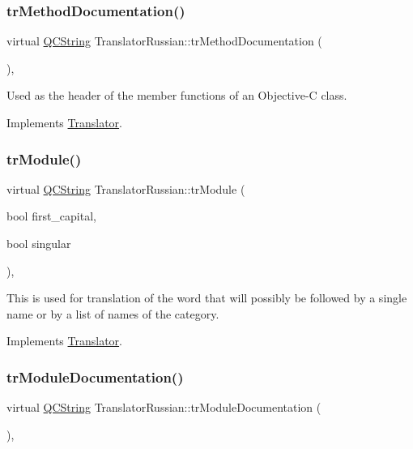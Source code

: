 \subsubsection{\texorpdfstring{trMethodDocumentation()}{trMethodDocumentation()}}
{\footnotesize\ttfamily virtual \mbox{\hyperlink{class_q_c_string}{Q\+C\+String}} Translator\+Russian\+::tr\+Method\+Documentation (\begin{DoxyParamCaption}{ }\end{DoxyParamCaption})\hspace{0.3cm}{\ttfamily [inline]}, {\ttfamily [virtual]}}

Used as the header of the member functions of an Objective-\/C class. 

Implements \mbox{\hyperlink{class_translator}{Translator}}.

\mbox{\label{class_translator_russian_ac995e3a2adc188b6cb5881d9b891533a}} 
\subsubsection{\texorpdfstring{trModule()}{trModule()}}
{\footnotesize\ttfamily virtual \mbox{\hyperlink{class_q_c_string}{Q\+C\+String}} Translator\+Russian\+::tr\+Module (\begin{DoxyParamCaption}\item[{bool}]{first\+\_\+capital,  }\item[{bool}]{singular }\end{DoxyParamCaption})\hspace{0.3cm}{\ttfamily [inline]}, {\ttfamily [virtual]}}

This is used for translation of the word that will possibly be followed by a single name or by a list of names of the category. 

Implements \mbox{\hyperlink{class_translator}{Translator}}.

\mbox{\label{class_translator_russian_a825ced640e66397b0d389679cd3c147a}} 
\subsubsection{\texorpdfstring{trModuleDocumentation()}{trModuleDocumentation()}}
{\footnotesize\ttfamily virtual \mbox{\hyperlink{class_q_c_string}{Q\+C\+String}} Translator\+Russian\+::tr\+Module\+Documentation (\begin{DoxyParamCaption}{ }\end{DoxyParamCaption})\hspace{0.3cm}{\ttfamily [inline]}, {\ttfamily [virtual]}}

